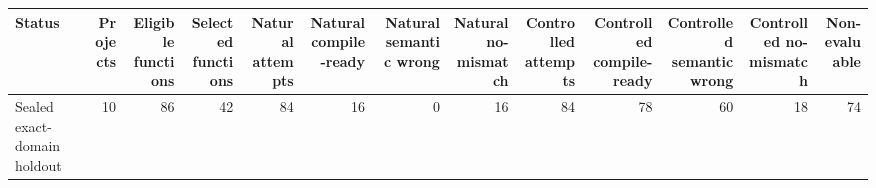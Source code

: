 \begin{tabular}{lrrrrrrrrrrrr}
\toprule
Status & Projects & Eligible functions & Selected functions & Natural attempts & Natural compile-ready & Natural semantic wrong & Natural no-mismatch & Controlled attempts & Controlled compile-ready & Controlled semantic wrong & Controlled no-mismatch & Non-evaluable \\
\midrule
Sealed exact-domain holdout & 10 & 86 & 42 & 84 & 16 & 0 & 16 & 84 & 78 & 60 & 18 & 74 \\
\bottomrule
\end{tabular}
